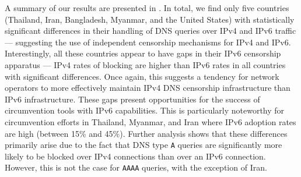 A summary of our results are presented in .
In total, we find only five countries (Thailand, Iran, Bangladesh, Myanmar, and
the United States) with statistically significant differences in their handling
of DNS queries over IPv4 and IPv6 traffic --- suggesting the use of independent
censorship mechanisms for IPv4 and IPv6. 
%
Interestingly, all these countries appear to have gaps in their IPv6 censorship
apparatus --- \ie IPv4 rates of blocking are higher than IPv6 rates in all
countries with significant differences. Once again, this suggests a tendency
for network operators to more effectively maintain IPv4 DNS censorship
infrastructure than IPv6 infrastructure. These gaps present opportunities for
the success of circumvention tools with IPv6 capabilities. 
%
This is particularly noteworthy for circumvention efforts in Thailand, Myanmar,
and Iran where IPv6 adoption rates are high (between 15\% and 45\%).
%
Further analysis shows that these differences primarily arise due to the fact
that DNS type {\tt A} queries are significantly more likely to be blocked over
IPv4 connections than over an IPv6 connection. However, this is not the case
for {\tt AAAA} queries, with the exception of Iran.

